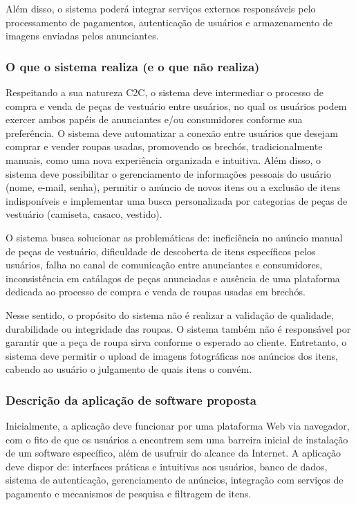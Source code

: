 \documentclass[
	article,			%
	11pt,				%
	oneside,			%
	a4paper,			%
	english,			%
	brazil,				%
	sumario=tradicional
	]{abntex2}
\begin{document}
Além disso, o sistema poderá integrar serviços externos responsáveis pelo processamento de pagamentos, autenticação de usuários e armazenamento de imagens enviadas pelos anunciantes.

\subsubsection{O que o sistema realiza (e o que não realiza)}
\label{sec:Realiza}

Respeitando a sua natureza C2C, o sistema deve intermediar o processo de compra e venda de peças de vestuário entre usuários, no qual os usuários podem exercer ambos papéis de anunciantes e/ou consumidores conforme sua preferência. O sistema deve automatizar a conexão entre usuários que desejam comprar e vender roupas usadas, promovendo os brechós, tradicionalmente manuais, como uma nova experiência organizada e intuitiva. Além disso, o sistema deve possibilitar o gerenciamento de informações pessoais do usuário (nome, e-mail, senha), permitir o anúncio de novos itens ou a exclusão de itens indisponíveis e implementar uma busca personalizada por categorias de peças de vestuário (camiseta, casaco, vestido).

O sistema busca solucionar as problemáticas de: ineficiência no anúncio manual de peças de vestuário, dificuldade de descoberta de itens específicos pelos usuários, falha no canal de comunicação entre anunciantes e consumidores, inconsistência em catálagos de peças anunciadas e ausência de uma plataforma dedicada ao processo de compra e venda de roupas usadas em brechós.

Nesse sentido, o propósito do sistema não é realizar a validação de qualidade, durabilidade ou integridade das roupas. O sistema também não é responsável por garantir que a peça de roupa sirva conforme o esperado ao cliente. Entretanto, o sistema deve permitir o upload de imagens fotográficas nos anúncios dos itens, cabendo ao usuário o julgamento de quais itens o convém.

\subsubsection{Descrição da aplicação de software proposta}
\label{sec:DescricaoAplicacao}

Inicialmente, a aplicação deve funcionar por uma plataforma Web via navegador, com o fito de que os usuários a encontrem sem uma barreira inicial de instalação de um software específico, além de usufruir do alcance da Internet. A aplicação deve dispor de: interfaces práticas e intuitivas aos usuários, banco de dados, sistema de autenticação, gerenciamento de anúncios, integração com serviços de pagamento e mecanismos de pesquisa e filtragem de itens.
\end{document}
